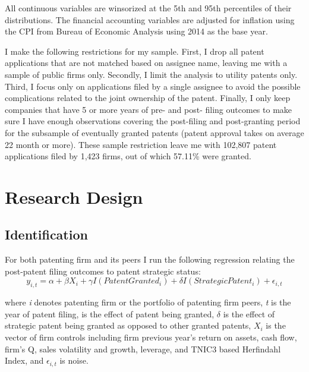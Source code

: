 \documentclass[11pt]{article}
\begin{document}
All continuous variables are winsorized at the 5th and 95th percentiles of their distributions.
The financial accounting variables are adjusted for inflation using the CPI from Bureau of Economic
Analysis using 2014 as the base year.

I make the following restrictions for my sample. First, I drop all patent applications that are
not matched based on assignee name, leaving me with a sample of public firms only. Secondly,
I limit the analysis to utility patents only. Third, I focus only on applications filed by a single
assignee to avoid the possible complications related to the joint ownership of the patent. Finally,
I only keep companies that have 5 or more years of pre- and post- filing outcomes to make sure
I have enough observations covering the post-filing and post-granting period for the subsample of
eventually granted patents (patent approval takes on average 22 month or more). These sample
restriction leave me with 102,807 patent applications filed by 1,423 firms, out of which 57.11\% were
granted.

\section{Research Design} \label{sec:Data}
\subsection{Identification} 

For both patenting firm and its peers I run the following regression relating the post-patent
filing outcomes to patent strategic status:
\begin{equation} \label{eq:reg1}
y_{i,t} = \alpha + \beta X_i + \gamma I(PatentGranted_i) + \delta I(StrategicPatent_i)+\epsilon_{i,t}
\end{equation}


where \textit{i} denotes patenting firm or the portfolio of patenting firm peers, \textit{t} is the year of patent filing,
is the effect of patent being granted, $\delta$ is the effect of strategic patent being granted as opposed
to other granted patents, $X_i$ is the vector of firm controls including firm previous year's return
on assets, cash flow, firm's Q, sales volatility and growth, leverage, and TNIC3 based Herfindahl
Index, and $\epsilon_{i,t}$ is noise.
\end{document}
